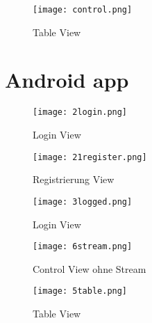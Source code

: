 \begin{figure}[ht]
  \begin{center}
    \texttt{[image: control.png]}
  		  \caption{Table View}
  \end{center}
\end{figure}


\newpage
\section{Android app}\label{A.android}


\begin{figure}[h]
\begin{minipage}[h]{8cm}
	\centering
	\texttt{[image: 2login.png]}
	\caption{Login View}
\end{minipage}
\hfill
\begin{minipage}[h]{8cm}
	\centering
	\texttt{[image: 21register.png]}
	\caption{Registrierung View}
\end{minipage}
\end{figure}


\begin{figure}[h]
\begin{minipage}[h]{8cm}
	\centering
	\texttt{[image: 3logged.png]}
	\caption{Login View}
\end{minipage}
\hfill
\begin{minipage}[h]{8cm}
	\centering
	\texttt{[image: 6stream.png]}
	\caption{Control View ohne Stream}
\end{minipage}
\end{figure}


\begin{figure}[ht]
  \begin{center}
    \texttt{[image: 5table.png]}
  		  \caption{Table View}
  \end{center}
\end{figure}



